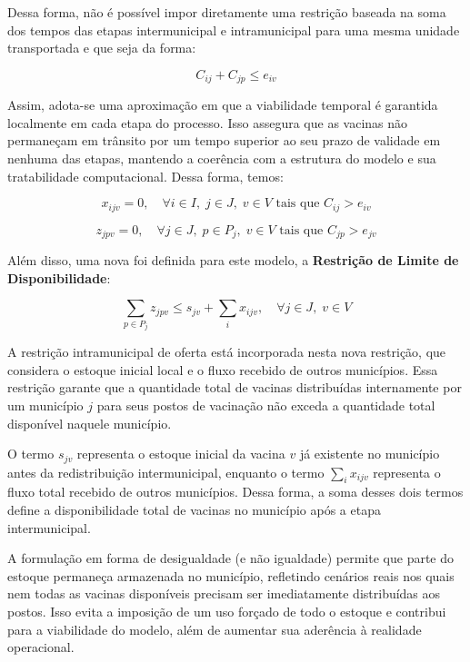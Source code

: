 Dessa forma, não é possível impor diretamente uma restrição baseada na soma dos tempos das etapas intermunicipal e intramunicipal para uma mesma unidade transportada e que seja da forma:

\[
C_{ij} + C_{jp} \le e_{iv}
\]

Assim, adota-se uma aproximação em que a viabilidade temporal é garantida localmente em cada etapa do processo. Isso assegura que as vacinas não permaneçam em trânsito por um tempo superior ao seu prazo de validade em nenhuma das etapas, mantendo a coerência com a estrutura do modelo e sua tratabilidade computacional. Dessa forma, temos:

\begin{equation*}
x_{ijv} = 0, \quad \forall i \in I, \; j \in J, \; v \in V \text{ tais que } C_{ij} > e_{iv}
\end{equation*}

\begin{equation*}
z_{jpv} = 0, \quad \forall j \in J, \; p \in P_j, \; v \in V \text{ tais que } C_{jp} > e_{jv}
\end{equation*}

Além disso, uma nova foi definida para este modelo, a \textbf{Restrição de Limite de Disponibilidade}:

\begin{equation*}
\sum_{p \in P_j} z_{jpv} \le 
s_{jv} +\sum_{i} x_{ijv}, \quad \forall j \in J, \; v \in V
\end{equation*}

A restrição intramunicipal de oferta está  incorporada nesta nova restrição, que considera o estoque inicial local e o fluxo recebido de outros municípios. Essa restrição garante que a quantidade total de vacinas distribuídas internamente por um município $j$ para seus postos de vacinação não exceda a quantidade total disponível naquele município.

O termo $s_{jv}$ representa o estoque inicial da vacina $v$ já existente no município antes da redistribuição intermunicipal, enquanto o termo $\sum_{i} x_{ijv}$ representa o fluxo total recebido de outros municípios. Dessa forma, a soma desses dois termos define a disponibilidade total de vacinas no município após a etapa intermunicipal.

A formulação em forma de desigualdade (e não igualdade) permite que parte do estoque permaneça armazenada no município, refletindo cenários reais nos quais nem todas as vacinas disponíveis precisam ser imediatamente distribuídas aos postos. Isso evita a imposição de um uso forçado de todo o estoque e contribui para a viabilidade do modelo, além de aumentar sua aderência à realidade operacional.

